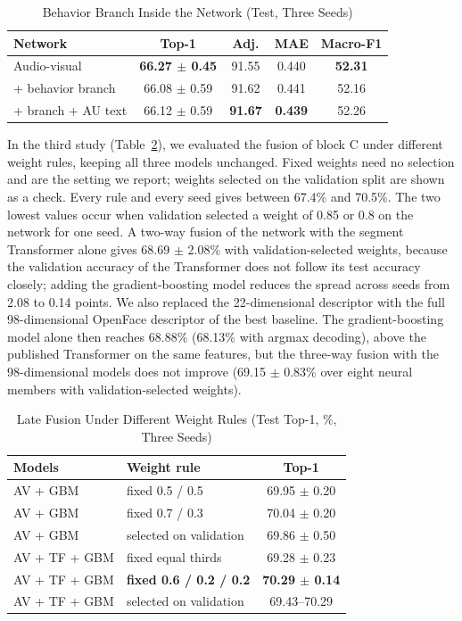\documentclass[journal]{IEEEtran}
\begin{document}
\begin{table}[!t]
\setlength{\tabcolsep}{3pt}
\renewcommand{\arraystretch}{1.2}
\caption{Behavior Branch Inside the Network (Test, Three Seeds)}
\label{tab_branch}
\centering
\begin{tabular}{lcccc}
\hline
Network & Top-1 & Adj. & MAE & Macro-F1\\
\hline
Audio-visual & \textbf{66.27 $\pm$ 0.45} & 91.55 & 0.440 & \textbf{52.31}\\
+ behavior branch & 66.08 $\pm$ 0.59 & 91.62 & 0.441 & 52.16\\
+ branch + AU text & 66.12 $\pm$ 0.59 & \textbf{91.67} & \textbf{0.439} & 52.26\\
\hline
\end{tabular}
\end{table}

In the third study (Table~\ref{tab_fusion}), we evaluated the fusion of block C under different weight rules, keeping all three models unchanged. Fixed weights need no selection and are the setting we report; weights selected on the validation split are shown as a check. Every rule and every seed gives between 67.4\% and 70.5\%. The two lowest values occur when validation selected a weight of 0.85 or 0.8 on the network for one seed. A two-way fusion of the network with the segment Transformer alone gives 68.69 $\pm$ 2.08\% with validation-selected weights, because the validation accuracy of the Transformer does not follow its test accuracy closely; adding the gradient-boosting model reduces the spread across seeds from 2.08 to 0.14 points. We also replaced the 22-dimensional descriptor with the full 98-dimensional OpenFace descriptor of the best baseline. The gradient-boosting model alone then reaches 68.88\% (68.13\% with argmax decoding), above the published Transformer on the same features, but the three-way fusion with the 98-dimensional models does not improve (69.15 $\pm$ 0.83\% over eight neural members with validation-selected weights).

\begin{table}[!t]
\setlength{\tabcolsep}{3pt}
\renewcommand{\arraystretch}{1.2}
\caption{Late Fusion Under Different Weight Rules (Test Top-1, \%, Three Seeds)}
\label{tab_fusion}
\centering
\begin{tabular}{llc}
\hline
Models & Weight rule & Top-1\\
\hline
AV + GBM & fixed 0.5 / 0.5 & 69.95 $\pm$ 0.20\\
AV + GBM & fixed 0.7 / 0.3 & 70.04 $\pm$ 0.20\\
AV + GBM & selected on validation & 69.86 $\pm$ 0.50\\
AV + TF + GBM & fixed equal thirds & 69.28 $\pm$ 0.23\\
AV + TF + GBM & \textbf{fixed 0.6 / 0.2 / 0.2} & \textbf{70.29 $\pm$ 0.14}\\
AV + TF + GBM & selected on validation & 69.43--70.29\\
\hline
\end{tabular}
\end{table}
\end{document}
